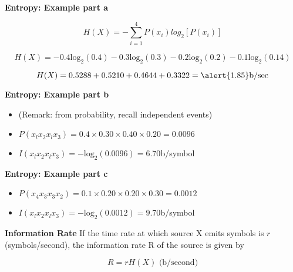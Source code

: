 \documentclass[]{article}
\begin{document}


\noindent \textbf{Entropy: Example part a}

\[ H(X) = - \sum \limits^{4}_{i=1} P(x_i) log_2 [P(x_i)] \]

\[ H(X) = -0.4\mbox{log}_2(0.4) - 0.3\mbox{log}_2(0.3)  -0.2\mbox{log}_2(0.2)  -0.1\mbox{log}_2(0.14) \]



\[ H(X) =  0.5288 + 0.5210 + 0.4644 + 0.3322  = \alert{1.85} \mbox{b/sec} \]






\noindent \textbf{Entropy: Example part b}
\begin{itemize}
\item (Remark: from probability, recall independent events) \bigskip
\item $P(x_lx_2x_lx_3) = 0.4\times 0.30 \times 0.40 \times 0.20  = 0.0096$ \bigskip
\item $I(x_lx_2x_lx_3) = -\mbox{log}_2(0.0096)  = 6.70$b/symbol \bigskip
\end{itemize}



\noindent \textbf{Entropy: Example part c}
\begin{itemize}
\item $P(x_4x_3x_3x_2) = 0.1\times 0.20 \times 0.20 \times 0.30  = 0.0012$ \bigskip
\item $I(x_lx_2x_lx_3) = -\mbox{log}_2(0.0012)  = 9.70$b/symbol \bigskip
\end{itemize}





\noindent \textbf{Information Rate}
If the time rate at which source X emits symbols is $r$ (symbols/second), the information rate R of the
source is given by

\[R = rH(X) \mbox{      (b/second)} \]
\end{document}
